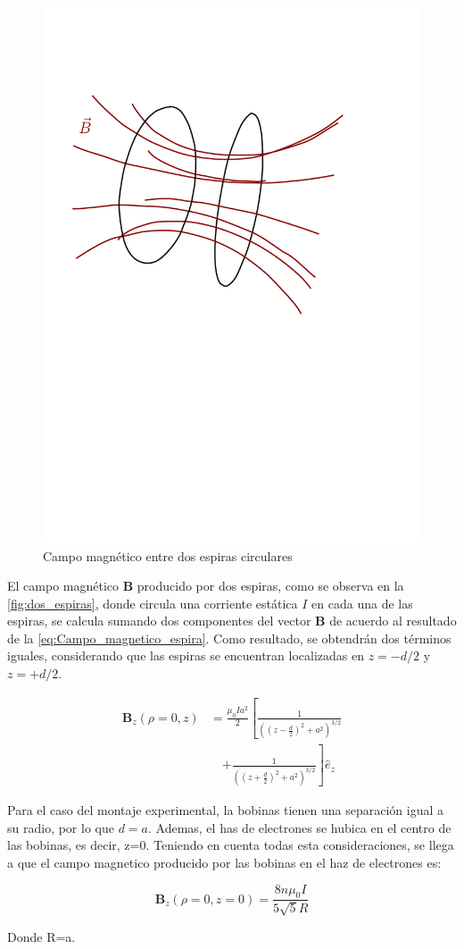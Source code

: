 \begin{figure}[H]
  \centering
  \includegraphics[width=0.6\linewidth]{./images/coils-field.pdf}
  \caption{Campo magnético entre dos espiras circulares}
  \label{fig:CM_dos_espiras}
\end{figure}

El campo magnético $\mathbf{B}$ producido por dos espiras, como se observa en la
\cref{fig:dos_espiras}, donde circula una corriente estática $I$ en cada una de
las espiras, se calcula sumando dos componentes del vector $\mathbf{B}$ de
acuerdo al resultado de la \cref{eq:Campo_magnetico_espira}.
Como resultado, se obtendrán dos términos iguales, considerando que las espiras
se encuentran localizadas en $z = -d/2$ y $z = +d/2$.

\begin{equation}
\begin{aligned}
  \mathbf{B}_{z}(\rho=0,z) &= \frac{\mu_{0} I a^{2}}{2} \left[ \frac{1}{\left((z-\frac{d}{2})^{2} + a^{2}\right)^{3/2}} \right.\\
                           &\quad \left.+ \frac{1}{\left((z+\frac{d}{2})^{2} + a^{2}\right)^{3/2}} \right] \hat{e}_{z}
  \label{Campo_magnetico_2espiras}
\end{aligned}
\end{equation}

Para el caso del montaje experimental, la bobinas tienen una separación igual a
su radio, por lo que $d=a$. Ademas, el has de electrones se hubica en el centro
de las bobinas, es decir, z=0. Teniendo en cuenta todas esta consideraciones,
se llega a que el campo magnetico producido por las bobinas en el haz de
electrones es: \cite{boix_practica_2}

\begin{equation}
  \mathbf{B}_{z}(\rho=0,z=0)= \frac{8 n \mu_{0} I}{5 \sqrt{5} R}
  \label{Campo_magnetico_enHaz}
\end{equation}

Donde R=a.
